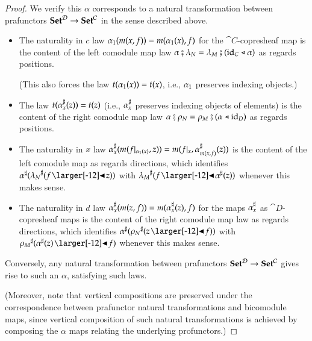 \documentclass{amsart}
\begin{document}
\begin{proof}
  We verify this $\alpha$ corresponds to a natural transformation
  between prafunctors ${\normalfont\mathbf{Set}}^{\mathcal{D}} \to {\normalfont\mathbf{Set}}^{\mathcal{C}}$ in the sense
  described above.
  \begin{itemize}
  \item The naturality in $c$ law
    ${\alpha}_1(m(x,f)) = m({\alpha}_1(x),f)$ for the
    $\cat{C}$-copresheaf map is the content of the left comodule map
    law
    $\alpha \fatsemi \lambda_N = \lambda_M \fatsemi (\mathrm{id}_C \mathrel{\triangleleft}
    \alpha)$ as regards positions.
    
    (This also forces the law $t({\alpha}_1(x)) = t(x)$, i.e.,
    ${\alpha}_1$ preserves indexing objects.)
  \item The law $t({\alpha}^\sharp_{x}(z)) = t(z)$ (i.e.,
    ${\alpha}^\sharp_{x}$ preserves indexing objects of elements)
    is the content of the right comodule map law
    $\alpha \fatsemi \rho_N = \rho_M \fatsemi (\alpha \mathrel{\triangleleft} \mathrm{id}_D)$ as
    regards positions.
  \item The naturality in $x$ law
    ${\alpha}^\sharp_{x}(m(f|_{{\alpha}_1(x)}, z)) =
    m(f|_{x}, {\alpha}^\sharp_{m(x, f)}(z))$ is the content of the
    left comodule map as regards directions, which identifies
    ${\anydirmapof{\alpha}{\anydirmapof{\lambda_N}{f \subd z}}}$ with
    $\anydirmapof{\lambda_M}{f \subd \anydirmapof{\alpha}{z}}$ whenever
    this makes sense.
  \item The naturality in $d$ law
    ${\alpha}^\sharp_{x}(m(z, f)) = m({\alpha}^\sharp_{x}(z), f)$
    for the maps ${\alpha}^\sharp_{x}$ as $\cat{D}$-copresheaf maps is
    the content of the right comodule map law as regards directions,
    which identifies
    $\anydirmapof{\alpha}{\anydirmapof{\rho_N}{z \subd f}}$ with
    $\anydirmapof{\rho_M}{\anydirmapof{\alpha}{z} \subd f}$ whenever
    this makes sense.
  \end{itemize}

  Conversely, any natural transformation between prafunctors
  ${\normalfont\mathbf{Set}}^{\mathcal{D}} \to {\normalfont\mathbf{Set}}^{\mathcal{C}}$ gives rise to such an $\alpha$,
  satisfying such laws.

  (Moreover, note that vertical compositions are preserved under the
  correspondence between prafunctor natural transformations and
  bicomodule maps, since vertical composition of such natural
  transformations is achieved by composing the $\alpha$ maps relating
  the underlying profunctors.)
\end{proof}
\end{document}

